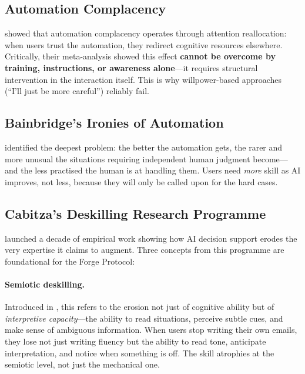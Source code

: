 \documentclass[11pt,a4paper]{article}
\begin{document}
\subsection{Automation Complacency}

\citet{parasuraman2010complacency} showed that automation complacency operates
through attention reallocation: when users trust the automation, they redirect
cognitive resources elsewhere. Critically, their meta-analysis showed this effect
\textbf{cannot be overcome by training, instructions, or awareness alone}---it
requires structural intervention in the interaction itself. This is why
willpower-based approaches (``I'll just be more careful'') reliably fail.

\subsection{Bainbridge's Ironies of Automation}

\citet{bainbridge1983ironies} identified the deepest problem: the better the
automation gets, the rarer and more unusual the situations requiring independent
human judgment become---and the less practised the human is at handling them.
Users need \emph{more} skill as AI improves, not less, because they will only be
called upon for the hard cases.

\subsection{Cabitza's Deskilling Research Programme}

\citet{cabitza2017unintended} launched a decade of empirical work showing how AI
decision support erodes the very expertise it claims to augment. Three concepts
from this programme are foundational for the Forge Protocol:

\paragraph{Semiotic deskilling.} Introduced in \citet{cabitza2021cobra}, this
refers to the erosion not just of cognitive ability but of \emph{interpretive
capacity}---the ability to read situations, perceive subtle cues, and make sense
of ambiguous information. When users stop writing their own emails, they lose not
just writing fluency but the ability to read tone, anticipate interpretation, and
notice when something is off. The skill atrophies at the semiotic level, not just
the mechanical one.
\end{document}
